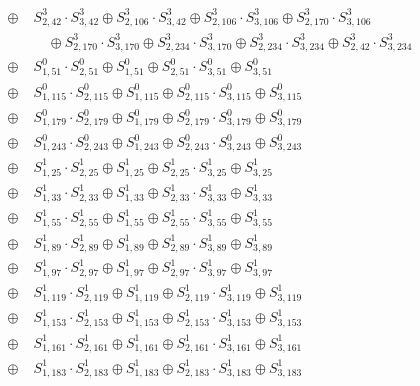 \begin{align*}
\oplus\; & S^3_{2,42} \cdot S^3_{3,42} \oplus S^3_{2,106} \cdot S^3_{3,42} \oplus S^3_{2,106} \cdot S^3_{3,106} \oplus S^3_{2,170} \cdot S^3_{3,106}\\
&\quad \oplus S^3_{2,170} \cdot S^3_{3,170} \oplus S^3_{2,234} \cdot S^3_{3,170} \oplus S^3_{2,234} \cdot S^3_{3,234} \oplus S^3_{2,42} \cdot S^3_{3,234}\tag*{weight 3}\\
\oplus\; & S^0_{1,51} \cdot S^0_{2,51} \oplus S^0_{1,51} \oplus S^0_{2,51} \cdot S^0_{3,51} \oplus S^0_{3,51}\tag*{weight 1}\\
\oplus\; & S^0_{1,115} \cdot S^0_{2,115} \oplus S^0_{1,115} \oplus S^0_{2,115} \cdot S^0_{3,115} \oplus S^0_{3,115}\tag*{weight 1}\\
\oplus\; & S^0_{1,179} \cdot S^0_{2,179} \oplus S^0_{1,179} \oplus S^0_{2,179} \cdot S^0_{3,179} \oplus S^0_{3,179}\tag*{weight 1}\\
\oplus\; & S^0_{1,243} \cdot S^0_{2,243} \oplus S^0_{1,243} \oplus S^0_{2,243} \cdot S^0_{3,243} \oplus S^0_{3,243}\tag*{weight 1}\\
\oplus\; & S^1_{1,25} \cdot S^1_{2,25} \oplus S^1_{1,25} \oplus S^1_{2,25} \cdot S^1_{3,25} \oplus S^1_{3,25}\tag*{weight 1}\\
\oplus\; & S^1_{1,33} \cdot S^1_{2,33} \oplus S^1_{1,33} \oplus S^1_{2,33} \cdot S^1_{3,33} \oplus S^1_{3,33}\tag*{weight 1}\\
\oplus\; & S^1_{1,55} \cdot S^1_{2,55} \oplus S^1_{1,55} \oplus S^1_{2,55} \cdot S^1_{3,55} \oplus S^1_{3,55}\tag*{weight 1}\\
\oplus\; & S^1_{1,89} \cdot S^1_{2,89} \oplus S^1_{1,89} \oplus S^1_{2,89} \cdot S^1_{3,89} \oplus S^1_{3,89}\tag*{weight 1}\\
\oplus\; & S^1_{1,97} \cdot S^1_{2,97} \oplus S^1_{1,97} \oplus S^1_{2,97} \cdot S^1_{3,97} \oplus S^1_{3,97}\tag*{weight 1}\\
\oplus\; & S^1_{1,119} \cdot S^1_{2,119} \oplus S^1_{1,119} \oplus S^1_{2,119} \cdot S^1_{3,119} \oplus S^1_{3,119}\tag*{weight 1}\\
\oplus\; & S^1_{1,153} \cdot S^1_{2,153} \oplus S^1_{1,153} \oplus S^1_{2,153} \cdot S^1_{3,153} \oplus S^1_{3,153}\tag*{weight 1}\\
\oplus\; & S^1_{1,161} \cdot S^1_{2,161} \oplus S^1_{1,161} \oplus S^1_{2,161} \cdot S^1_{3,161} \oplus S^1_{3,161}\tag*{weight 1}\\
\oplus\; & S^1_{1,183} \cdot S^1_{2,183} \oplus S^1_{1,183} \oplus S^1_{2,183} \cdot S^1_{3,183} \oplus S^1_{3,183}\tag*{weight 1}\\

\end{align*}
